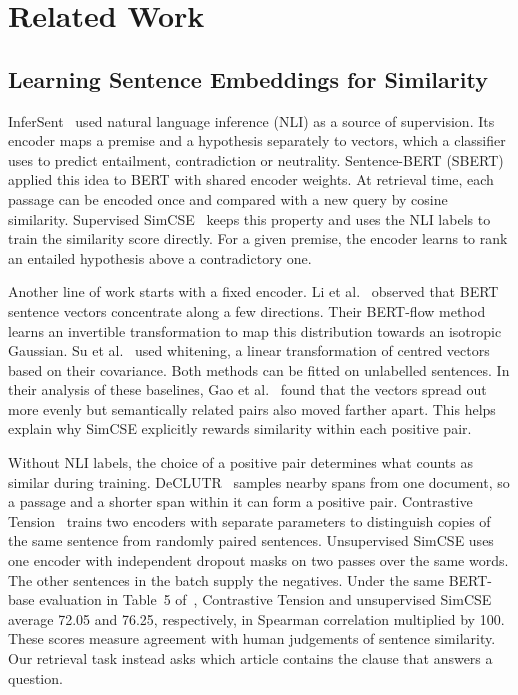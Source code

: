 \section{Related Work}
\label{sec:related}

\subsection{Learning Sentence Embeddings for Similarity}
\label{sec:related-embeddings}

InferSent~\cite{conneau-etal-2017-supervised} used natural language inference
(NLI) as a source of supervision. Its encoder maps a premise and a hypothesis
separately to vectors, which a classifier uses to predict entailment,
contradiction or neutrality. Sentence-BERT (SBERT)~\cite{reimers-gurevych-2019-sentence}
applied this idea to BERT with shared encoder weights. At retrieval time,
each passage can be encoded once and compared with a new query by cosine
similarity. Supervised SimCSE~\cite{gao-etal-2021-simcse} keeps this property
and uses the NLI labels to train the similarity score directly. For a given
premise, the encoder learns to rank an entailed hypothesis above a
contradictory one.

Another line of work starts with a fixed encoder. Li et
al.~\cite{li-etal-2020-sentence} observed that BERT sentence vectors
concentrate along a few directions. Their BERT-flow method learns an
invertible transformation to map this distribution towards an isotropic
Gaussian. Su et al.~\cite{su2021whiteningsentencerepresentationsbetter}
used whitening, a linear transformation of centred vectors based on their
covariance. Both methods can be fitted on unlabelled sentences. In their
analysis of these baselines, Gao et al.~\cite{gao-etal-2021-simcse} found
that the vectors spread out more evenly but semantically related pairs
also moved farther apart. This helps explain why SimCSE explicitly rewards
similarity within each positive pair.

Without NLI labels, the choice of a positive pair determines what counts as
similar during training. DeCLUTR~\cite{giorgi-etal-2021-declutr} samples nearby
spans from one document, so a passage and a shorter span within it can form a
positive pair. Contrastive Tension~\cite{carlsson2021semantic} trains two
encoders with separate parameters to distinguish copies of the same sentence
from randomly paired sentences. Unsupervised SimCSE uses one encoder with independent
dropout masks on two passes over the same words. The other sentences in the
batch supply the negatives.
Under the same BERT-base evaluation in Table~5 of~\cite{gao-etal-2021-simcse},
Contrastive Tension and unsupervised SimCSE average 72.05 and 76.25,
respectively, in Spearman correlation multiplied by 100. These scores measure
agreement with human judgements of sentence similarity. Our retrieval task
instead asks which article contains the clause that answers a question.

